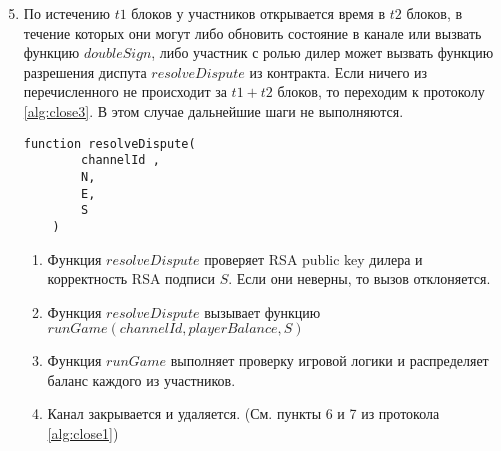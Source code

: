 \begin{algorithm}
\begin{enumerate}
	\setcounter{enumi}{4}
	\item По истечению $t1$ блоков у участников открывается время в $t2$ блоков, в течение которых они могут либо обновить состояние в канале или вызвать функцию $doubleSign$, либо участник с ролью дилер может вызвать функцию разрешения диспута $resolveDispute$ из контракта. Если ничего из перечисленного не происходит за $t1+t2$ блоков, то переходим к протоколу \autoref{alg:close3}. В этом случае дальнейшие шаги не выполняются. \label{block}
\begin{lstlisting}
function resolveDispute(
        channelId ,
        N,
        E,
        S
    )
\end{lstlisting}
\begin{enumerate}
	\item  Функция $resolveDispute$ проверяет RSA public key дилера и корректность RSA подписи $S$. Если они неверны, то вызов отклоняется.
	\item Функция $resolveDispute$ вызывает функцию $runGame(channelId , playerBalance, S)$
	 \item Функция $runGame$ выполняет проверку игровой логики и распределяет баланс каждого из участников.
	\item  Канал закрывается и удаляется. (См. пункты 6 и 7 из протокола \autoref{alg:close1})
\end{enumerate}
\end{enumerate}
\end{algorithm}


